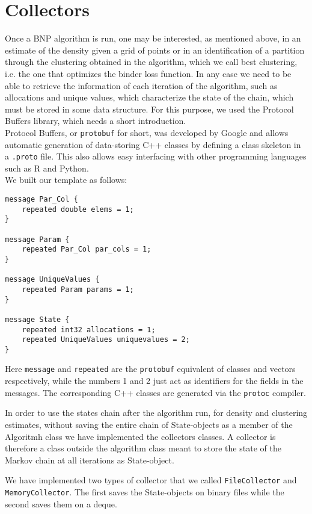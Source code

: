 \section{Collectors}\label{collectors}
Once a BNP algorithm is run, one may be interested, as mentioned above, in an estimate of the density given a grid of points or in an identification of a partition through the clustering obtained in the algorithm, which we call best clustering, i.e. the one that optimizes the binder loss function.
In any case we need to be able to retrieve the information of each iteration of the algorithm, such as allocations and unique values, which characterize the state of the chain, which must be stored in some data structure.
For this purpose, we used the Protocol Buffers library, which needs a short introduction. \\
Protocol Buffers, or \verb|protobuf| for short, was developed by Google and allows automatic generation of data-storing C++ classes by defining a class skeleton in a \verb|.proto| file.
This also allows easy interfacing with other programming languages such as R and Python. \\
We built our template as follows:
\begin{verbatim}
message Par_Col {
    repeated double elems = 1;
}

message Param {
    repeated Par_Col par_cols = 1;
}

message UniqueValues {
    repeated Param params = 1;
}

message State {
    repeated int32 allocations = 1;
    repeated UniqueValues uniquevalues = 2;
}
\end{verbatim}
Here \verb|message| and \verb|repeated| are the \verb|protobuf| equivalent of classes and vectors respectively, while the numbers 1 and 2 just act as identifiers for the fields in the messages.
The corresponding C++ classes are generated via the \verb|protoc| compiler.


In order to use the states chain after the algorithm run, for density and clustering estimates, without saving the entire chain of State-objects as a member of the Algoritmh class we have implemented the collectors classes. 
A collector is therefore a class outside the algorithm class meant to store the state of the Markov chain at all iterations as State-object.


We have implemented two types of collector that we called \verb|FileCollector| and \verb|MemoryCollector|.
The first saves the State-objects on binary files while the second saves them on a deque.

